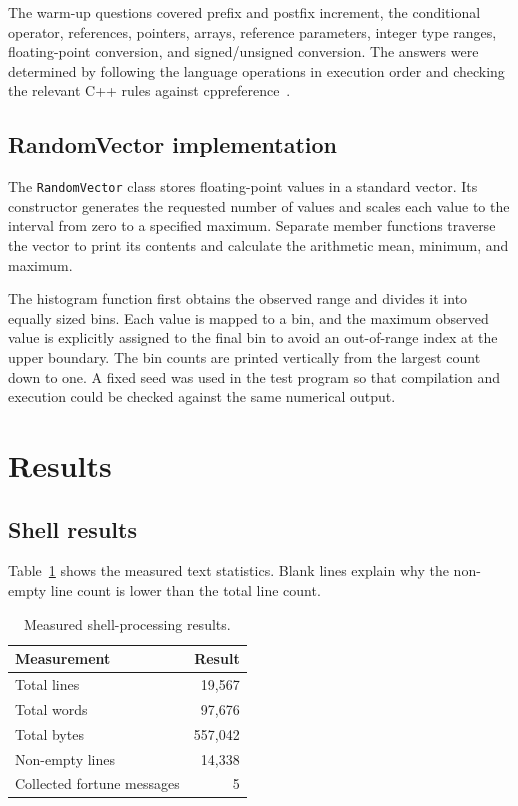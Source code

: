 \documentclass[11pt,a4paper]{article}
\begin{document}
The warm-up questions covered prefix and postfix increment, the conditional operator, references, pointers, arrays, reference parameters, integer type ranges, floating-point conversion, and signed/unsigned conversion. The answers were determined by following the language operations in execution order and checking the relevant C++ rules against cppreference~\cite{cppreference}.

\subsection{RandomVector implementation}

The \texttt{RandomVector} class stores floating-point values in a standard vector. Its constructor generates the requested number of values and scales each value to the interval from zero to a specified maximum. Separate member functions traverse the vector to print its contents and calculate the arithmetic mean, minimum, and maximum.

The histogram function first obtains the observed range and divides it into equally sized bins. Each value is mapped to a bin, and the maximum observed value is explicitly assigned to the final bin to avoid an out-of-range index at the upper boundary. The bin counts are printed vertically from the largest count down to one. A fixed seed was used in the test program so that compilation and execution could be checked against the same numerical output.

\section{Results}

\subsection{Shell results}

Table~\ref{tab:shell-results} shows the measured text statistics. Blank lines explain why the non-empty line count is lower than the total line count.

\begin{table}[H]
  \centering
  \caption{Measured shell-processing results.}
  \label{tab:shell-results}
  \begin{tabular}{lr}
    \toprule
    Measurement & Result \\
    \midrule
    Total lines & 19,567 \\
    Total words & 97,676 \\
    Total bytes & 557,042 \\
    Non-empty lines & 14,338 \\
    Collected fortune messages & 5 \\
    \bottomrule
  \end{tabular}
\end{table}
\end{document}

